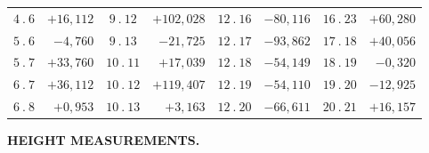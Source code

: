 {\begin{tabular}{|c|r||c|r||c|r||c|r|}
\(4\ .\ 6\) & \(+16{,}112\) & \(9\ .\ 12\) & \(+102{,}028\) & \(12\ .\ 16\) & \(-80{,}116\) & \(16\ .\ 23\) & \(+60{,}280\)\\
\(5\ .\ 6\) & \(-4{,}760\) & \(9\ .\ 13\) & \(-21{,}725\) & \(12\ .\ 17\) & \(-93{,}862\) & \(17\ .\ 18\) & \(+40{,}056\)\\
\(5\ .\ 7\) & \(+33{,}760\) & \(10\ .\ 11\) & \(+17{,}039\) & \(12\ .\ 18\) & \(-54{,}149\) & \(18\ .\ 19\) & \(-0{,}320\)\\
\(6\ .\ 7\) & \(+36{,}112\) & \(10\ .\ 12\) & \(+119{,}407\) & \(12\ .\ 19\) & \(-54{,}110\) & \(19\ .\ 20\) & \(-12{,}925\)\\
\(6\ .\ 8\) & \(+0{,}953\) & \(10\ .\ 13\) & \(+3{,}163\) & \(12\ .\ 20\) & \(-66{,}611\) & \(20\ .\ 21\) & \(+16{,}157\)\\
\end{tabular}\par}

\par\clearpage
\noindent\null\hfill{\small\textbf{HEIGHT MEASUREMENTS.}}\hfill{}\par\medskip

